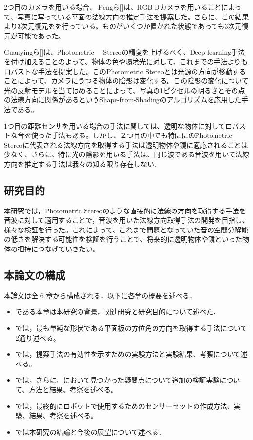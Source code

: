 2つ目のカメラを用いる場合、
Pengら[]は、RGB-Dカメラを用いることによって、写真に写っている平面の法線方向の推定手法を提案した。さらに、この結果より3次元復元をを行っている。ものがいくつか置かれた状態であっても3次元復元が可能であった。

Guanyingら[]は、Photometric　 Stereoの精度を上げるべく、Deep learning手法を付け加えることのよって、物体の色や環境光に対して、これまでの手法よりもロバストな手法を提案した。このPhotometric Stereoとは光源の方向が移動することによって、カメラにうつる物体の陰影は変化する。この陰影の変化について光の反射モデルを当てはめることによって、写真の1ピクセルの明るさとその点の法線方向に関係があるというShape-from-Shadingのアルゴリズムを応用した手法である。

1つ目の距離センサを用いる場合の手法に関しては、透明な物体に対してロバストな音を使った手法もある。しかし、２つ目の中でも特ににのPhotometric Stereoに代表される法線方向を取得する手法は透明物体や鏡に適応されることは少なく、さらに、特に光の陰影を用いる手法は、同じ波である音波を用いて法線方向を推定する手法は我々の知る限り存在しない．

\subsection{研究目的}
\label{sec:propose}
本研究では，Photometric Stereoのような直接的に法線の方向を取得する手法を音波に対して適用することで，音波を用いた法線方向取得手法の開発を目指し、様々な検証を行った。これによって、これまで問題となっていた音の空間分解能の低さを解決する可能性を検証を行うことで、将来的に透明物体や鏡といった物体の把持につなげていきたい。


\subsection{本論文の構成}
\label{sec:organization}
本論文は全 6 章から構成される．以下に各章の概要を述べる．

\begin{itemize}
  \item {}である本章は本研究の背景，関連研究と研究目的について述べた．
  \item {}では，最も単純な形状である平面板の方位角の方向を取得する手法について2通り述べる。
  \item {}では，提案手法の有効性を示すための実験方法と実験結果、考察について述べる。
  \item {}では，さらに、において見つかった疑問点について追加の検証実験について、方法と結果、考察を述べる。
  \item {}では，最終的にロボットで使用するためのセンサーセットの作成方法、実験、結果、考察を述べる。
  \item {}では本研究の結論と今後の展望について述べる．
\end{itemize}

\newpage


\newpage